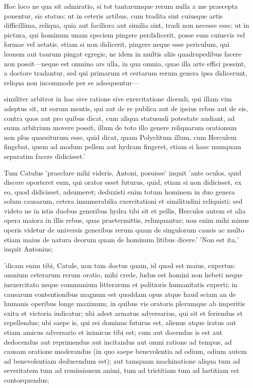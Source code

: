  Hoc loco ne qua sit admiratio, si tot tantarumque rerum nulla a me praecepta ponentur, sic statuo: ut in ceteris artibus, cum tradita sint cuiusque artis difficillima, reliqua, quia aut faciliora aut similia sint, tradi non necesse esse; ut in pictura, qui hominum unam speciem pingere perdidicerit, posse eum cuiusvis vel formae vel aetatis, etiam si non didicerit, pingere neque esse periculum, qui leonem aut taurum pingat egregie, ne idem in multis aliis quadrupedibus facere non possit—neque est omnino ars ulla, in qua omnia, quae illa arte effici possint, a doctore tradantur, sed qui primarum et certarum rerum genera ipsa didicerunt, reliqua non incommode per se adsequentur—

 similiter arbitror in hac sive ratione sive exercitatione dicendi, qui illam vim adeptus sit, ut eorum mentis, qui aut de re publica aut de ipsius rebus aut de eis, contra quos aut pro quibus dicat, cum aliqua statuendi potestate audiant, ad suum arbitrium movere possit, illum de toto illo genere reliquarum orationum non plus quaesiturum esse, quid dicat, quam Polyclitum illum, cum Herculem fingebat, quem ad modum pellem aut hydram fingeret, etiam si haec numquam separatim facere didicisset.'

 Tum Catulus 'praeclare mihi videris, Antoni, posuisse' inquit 'ante oculos, quid discere oporteret eum, qui orator esset futurus, quid, etiam si non didicisset, ex eo, quod didicisset, adsumeret; deduxisti enim totum hominem in duo genera solum causarum, cetera innumerabilia exercitationi et similitudini reliquisti: sed videto ne in istis duobus generibus hydra tibi sit et pellis, Hercules autem et alia opera maiora in illis rebus, quas praetermittis, relinquantur; non enim mihi minus operis videtur de universis generibus rerum quam de singulorum causis ac multo etiam maius de natura deorum quam de hominum litibus dicere.' 'Non est ita,' inquit Antonius;

 'dicam enim tibi, Catule, non tam doctus quam, id quod est maius, expertus: omnium ceterarum rerum oratio, mihi crede, ludus est homini non hebeti neque inexercitato neque communium litterarum et politioris humanitatis experti; in causarum contentionibus magnum est quoddam opus atque haud sciam an de humanis operibus longe maximum; in quibus vis oratoris plerumque ab imperitis exitu et victoria iudicatur; ubi adest armatus adversarius, qui sit et feriendus et repellendus; ubi saepe is, qui rei dominus futurus est, alienus atque iratus aut etiam amicus adversario et inimicus tibi est; cum aut docendus is est aut dedocendus aut reprimendus aut incitandus aut omni ratione ad tempus, ad causam oratione moderandus (in quo saepe benevolentia ad odium, odium autem ad benevolentiam deducendum est); aut tamquam machinatione aliqua tum ad severitatem tum ad remissionem animi, tum ad tristitiam tum ad laetitiam est contorquendus;


